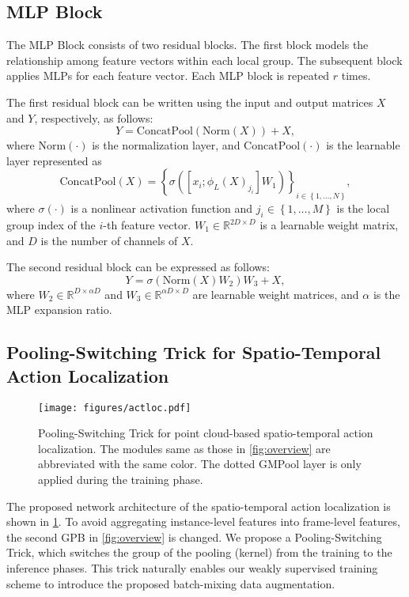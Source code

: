 \documentclass[10pt,twocolumn,letterpaper]{article}
\begin{document}
\subsection{MLP Block}
The MLP Block consists of two residual blocks.
The first block models the relationship among feature vectors within each local group.
The subsequent block applies MLPs for each feature vector.
Each MLP block is repeated $r$ times.

The first residual block can be written using the input and output matrices $X$ and $Y$, respectively, as follows:
\begin{equation}
  Y = \mathrm{ConcatPool}(\mathrm{Norm}(X)) + X,
\end{equation}
where $\mathrm{Norm(\cdot)}$ is the normalization layer, and $\mathrm{ConcatPool(\cdot)}$ is the learnable layer represented as
\begin{equation}
  \mathrm{ConcatPool}(X) = \left\{\sigma \left(\left[x_i; \phi_L\left(X\right)_{j_i}\right]W_1\right)\right\}_{i \in \left\{1,\ldots,N\right\}},
\end{equation}
where $\sigma(\cdot)$ is a nonlinear activation function and $j_i \in \left\{1,\ldots,M\right\}$ is the local group index of the $i$-th feature vector.
$W_1 \in \mathbb{R}^{2D \times D}$ is a learnable weight matrix, and $D$ is the number of channels of $X$.

The second residual block can be expressed as follows:
\begin{equation}
  Y = \sigma\left(\mathrm{Norm}\left(X\right)W_2\right)W_3 + X,
\end{equation}
where $W_2 \in \mathbb{R}^{D \times \alpha D} $ and $W_3 \in \mathbb{R}^{\alpha D \times D}$ are learnable weight matrices, and $\alpha$ is the MLP expansion ratio.

\subsection{Pooling-Switching Trick for Spatio-Temporal Action Localization}
\begin{figure}[tb]
  \centering
  \texttt{[image: figures/actloc.pdf]}
  \caption{Pooling-Switching Trick for point cloud-based spatio-temporal action localization.
  The modules same as those in \cref{fig:overview} are abbreviated with the same color.
  The dotted GMPool layer is only applied during the training phase.}
  \label{fig:actloc}
\end{figure}

The proposed network architecture of the spatio-temporal action localization is shown in \cref{fig:actloc}.
To avoid aggregating instance-level features into frame-level features, the second GPB in \cref{fig:overview} is changed.
We propose a Pooling-Switching Trick, which switches the group of the pooling (kernel) from the training to the inference phases.
This trick naturally enables our weakly supervised training scheme to introduce the proposed batch-mixing data augmentation.
\end{document}
